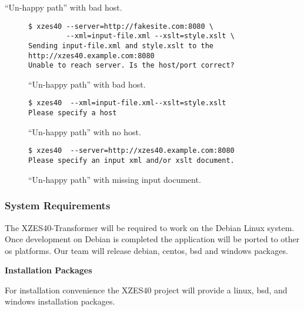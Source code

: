 ``Un-happy path'' with bad host.
\begin{figure}[H]
  \begin{lstlisting}
$ xzes40 --server=http://fakesite.com:8080 \
         --xml=input-file.xml --xslt=style.xslt \
Sending input-file.xml and style.xslt to the http://xzes40.example.com:8080
Unable to reach server. Is the host/port correct?
  \end{lstlisting}
  \caption{``Un-happy path'' with bad host.}
\end{figure}

\begin{figure}[H]
  \begin{lstlisting}
$ xzes40  --xml=input-file.xml--xslt=style.xslt
Please specify a host
  \end{lstlisting}
  \caption{``Un-happy path'' with no host.}
\end{figure}

\begin{figure}[H]
  \begin{lstlisting}
$ xzes40  --server=http://xzes40.example.com:8080
Please specify an input xml and/or xslt document.
  \end{lstlisting}
  \caption{``Un-happy path'' with missing input document.}
\end{figure}

\subsubsection{System Requirements}
\label{system-requirements}

The XZES40-Transformer will be required to work on the Debian Linux system.
Once development on Debian is completed the application will be ported to other \gls{os} platforms.
Our team will release \gls{debian}, \gls{centos}, \gls{bsd} and \gls{windows} packages.
  
\textbf{Installation Packages}
\label{installation-packages}

For installation convenience the XZES40 project will provide a \gls{linux}, \gls{bsd}, and \gls{windows} installation packages.

